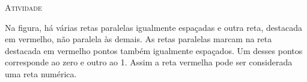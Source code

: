\documentclass[10 pt,usenames,dvipsnames, oneside]{article}
\begin{document}
\bigskip
\begin{center}
{\large \scshape Atividade}
\end{center}
\fi

Na figura, há várias retas paralelas igualmente espaçadas e outra reta, destacada em vermelho, não paralela às demais. As retas paralelas marcam na reta destacada em vermelho pontos também igualmente espaçados. Um desses pontos corresponde ao zero e outro ao 1. Assim a reta vermelha pode ser considerada uma reta numérica.

\begin{center}
\end{center}
\end{document}
